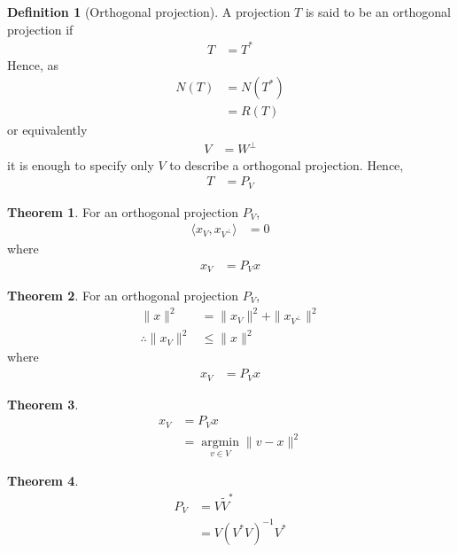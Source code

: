 \documentclass[titlepage, fleqn, a4paper, 12pt, twoside]{article}
\theoremstyle{definition}
\newtheorem{definition}{Definition}
\theoremstyle{theorem}
\newtheorem{theorem}{Theorem}
\renewcommand{\tilde}{\widetilde}
\DeclareMathOperator{\argmin}{\mathrm{argmin}}
\begin{document}
\begin{definition}[Orthogonal projection]
	A projection $T$ is said to be an orthogonal projection if
	\begin{align*}
		T &= T^*
	\end{align*}
	Hence, as
	\begin{align*}
		N(T) &= N\left( T^* \right)\\
		&= R(T)
	\end{align*}
	or equivalently
	\begin{align*}
		V &= W^{\perp}
	\end{align*}
	it is enough to specify only $V$ to describe a orthogonal projection.
	Hence,
	\begin{align*}
		T &= P_V
	\end{align*}
\end{definition}

\begin{theorem}
	For an orthogonal projection $P_V$,
	\begin{align*}
		\langle x_V , x_{V^{\perp}} \rangle &= 0
	\end{align*}
	where
	\begin{align*}
		x_V &= P_V x
	\end{align*}
\end{theorem}

\begin{theorem}
	For an orthogonal projection $P_V$,
	\begin{align*}
		\|x\|^2 &= \|x_V\|^2 + \|x_{V^{\perp}}\|^2\\
		\therefore \|x_V\|^2 &\le \|x\|^2
	\end{align*}
	where
	\begin{align*}
		x_V &= P_V x
	\end{align*}
\end{theorem}

\begin{theorem}
	\begin{align*}
		x_V &= P_V x\\
		&= \argmin\limits_{v \in V} \|v - x\|^2
	\end{align*}
\end{theorem}

\begin{theorem}
	\begin{align*}
		P_V &= V \tilde{V}^*\\
		&= V \left( V^* V \right)^{-1} V^*
	\end{align*}
\end{theorem}
\end{document}
